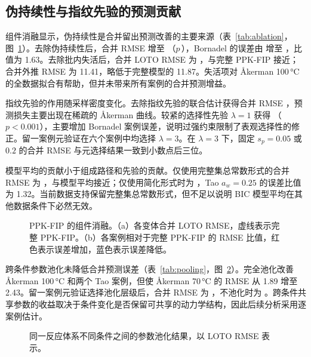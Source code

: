 \subsection{伪持续性与指纹先验的预测贡献}
组件消融显示，伪持续性是合并留出预测改善的主要来源（表~\ref{tab:ablation}，图~\ref{fig:ablation}）。去除伪持续性后，合并 RMSE 增至 \AblNoProc{}（$p$\,\AblNoProcP），Bornadel 的误差由 \LotoBornNew{} 增至 \AblNoProcBorn，比值为 1.63。去除批内失活后，合并 LOTO RMSE 为 \AblNoKd，与完整 PPK-FIP 接近；合并外推 RMSE 为 11.41，略低于完整模型的 11.87。失活项对 Åkerman 100\,°C 的全数据拟合有帮助，但并未带来所有案例的合并预测增益。

指纹先验的作用随采样密度变化。去除指纹先验的联合估计获得合并 RMSE \AblJoint，预测损失主要出现在稀疏的 Åkerman 曲线。较紧的选择性先验 $\lambda=1$ 获得 \AblLamOne{}（$p<0.001$），主要增加 Bornadel 案例误差，说明过强约束限制了表观选择性的修正。留一案例元验证在六个案例中均选择 $\lambda=3$。在 $\lambda=3$ 下，固定 $s_p=0.05$ 或 $0.2$ 的合并 RMSE 与元选择结果一致到小数点后三位。

模型平均的贡献小于组成路径和先验的贡献。仅使用完整集总常数形式的合并 RMSE 为 \AblFullOnly，与模型平均接近；仅使用简化形式时为 \AblSimplOnly，Tao $a_w=0.25$ 的误差比值为 1.32。当前数据支持保留完整集总常数形式，但不足以说明 BIC 模型平均在其他数据条件下必然无效。
\begin{figure}[!htbp]\centering{}\caption{PPK-FIP 的组件消融。（a）各变体合并 LOTO RMSE，虚线表示完整 PPK-FIP。（b）各案例相对于完整 PPK-FIP 的 RMSE 比值，红色表示误差增加，蓝色表示误差降低。}\label{fig:ablation}\end{figure}

跨条件参数池化未降低合并预测误差（表~\ref{tab:pooling}，图~\ref{fig:pooling}）。完全池化改善 Åkerman 100\,°C 和两个 Tao 案例，但使 Åkerman 70\,°C 的 RMSE 从 1.89 增至 2.43。留一案例元验证选择池化层级后，合并 RMSE 为 \PoolAllSel，不池化时为 \PoolAllLo。跨条件共享参数的收益取决于条件变化是否保留可共享的动力学结构，因此后续分析采用逐案例估计。
\begin{figure}[!htbp]\centering{}\caption{同一反应体系不同条件之间的参数池化结果，以 LOTO RMSE 表示。}\label{fig:pooling}\end{figure}

